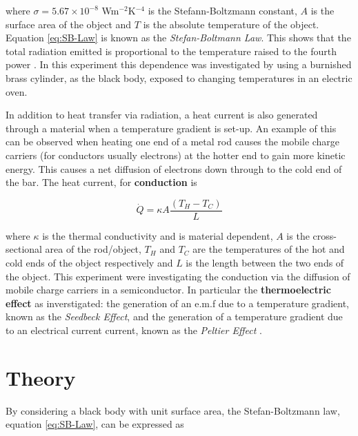 \documentclass{article}
\begin{document}
\vspace{2mm}
\noindent
where $\sigma = 5.67 \times 10^{-8}$ Wm$^{-2}$K$^{-4}$ is the Stefann-Boltzmann constant, $A$ is the surface area of the object and $T$ is the absolute temperature of the object. Equation \eqref{eq:SB-Law} is known as the \textit{Stefan-Boltmann Law}. This shows that the total radiation emitted is proportional to the temperature raised to the fourth power \cite{Paper01}. %
In this experiment this dependence was investigated by using a burnished brass cylinder, as the black body, exposed to changing temperatures in an electric oven.

\vspace{2mm}
\noindent
In addition to heat transfer via radiation, a heat current is also generated through a material when a temperature gradient is set-up. An example of this can be observed when heating one end of a metal rod causes the mobile charge carriers (for conductors usually electrons) \cite{Paper01} at the hotter end to gain more kinetic energy. This causes a net diffusion of electrons down through to the cold end of the bar. The heat current, for \textbf{conduction} is 

\begin{equation}
\label{eq:Conduction}
\dot{Q} = \kappa A \frac{(T_H - T_C)}{L}
\end{equation}

\vspace{2mm}
\noindent
where $\kappa$ is the thermal conductivity and is material dependent, $A$ is the cross-sectional area of the rod/object, $T_H$ and $T_C$ are the temperatures of the hot and cold ends of the object respectively and $L$ is the length between the two ends of the object. This experiment were investigating the conduction via the diffusion of mobile charge carriers \cite{Paper02} in a semiconductor. In particular the \textbf{thermoelectric effect} as inverstigated: the generation of an e.m.f due to a temperature gradient, known as the \textit{Seedbeck Effect}, and the generation of a temperature gradient due to an electrical current current, known as the \textit{Peltier Effect} \cite{Paper02}.


\section{Theory}
\label{sec:theory}

By considering a black body with unit surface area, the Stefan-Boltzmann law, equation \eqref{eq:SB-Law}, can be expressed as
\end{document}

